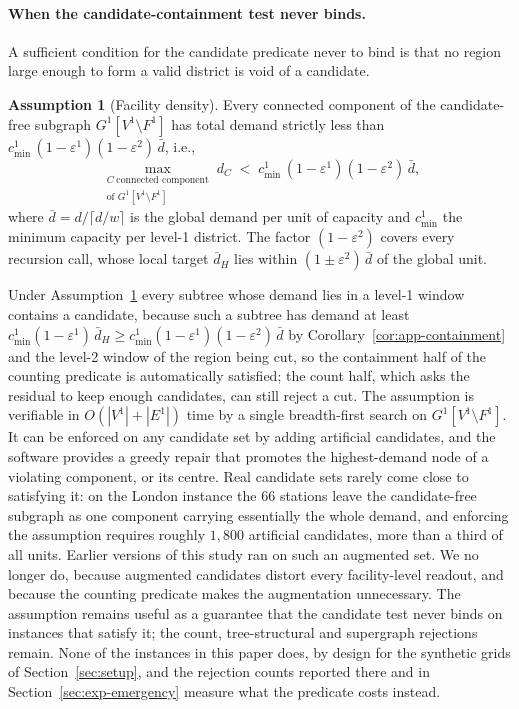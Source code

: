 \documentclass[preprint,12pt,authoryear]{elsarticle}
\theoremstyle{definition}
\newtheorem{assumption}[theorem]{Assumption}
\begin{document}
\paragraph{When the candidate-containment test never binds.}
A sufficient condition for the candidate predicate never to bind is that
no region large enough to form a valid district is void of a candidate.
%
\begin{assumption}[Facility density]
\label{asm:facility-density}
Every connected component of the candidate-free subgraph
$G^1[V^1 \setminus F^1]$ has total demand strictly less than
$c_{\min}^{1}\,(1-\varepsilon^1)(1-\varepsilon^2)\,\bar d$, i.e.,
\[
  \max_{\substack{C\;\text{connected component} \\ \text{of } G^1[V^1\setminus F^1]}}  d_C \;<\; c_{\min}^{1}\,(1-\varepsilon^1)(1-\varepsilon^2)\,\bar d,
\]
where $\bar d = d/\lceil d/w \rceil$ is the global demand per unit of capacity and $c^1_{\min}$ the minimum capacity per level-1 district. The factor $(1-\varepsilon^2)$ covers every recursion call, whose local target $\bar d_H$ lies within $(1\pm\varepsilon^2)\,\bar d$ of the global unit.
\end{assumption}
%
Under Assumption~\ref{asm:facility-density} every subtree whose demand
lies in a level-1 window contains a candidate, because such a subtree has demand at least $c^1_{\min}(1-\varepsilon^1)\,\bar d_H \geq c^1_{\min}(1-\varepsilon^1)(1-\varepsilon^2)\,\bar d$ by Corollary~\ref{cor:app-containment} and the level-2 window of the region being cut, so the containment half of the counting predicate is automatically satisfied; the count half, which asks the residual to keep enough candidates, can still reject a cut. The assumption is verifiable in $O(|V^1|+|E^1|)$ time by a single breadth-first search on $G^1[V^1 \setminus F^1]$. It can be enforced on any candidate set by adding artificial candidates, and the software provides a greedy repair that promotes the highest-demand node of a violating component, or its centre. Real candidate sets rarely come
close to satisfying it: on the London instance the $66$ stations leave the
candidate-free subgraph as one component carrying essentially the whole
demand, and enforcing the assumption requires roughly $1{,}800$ artificial
candidates, more than a third of all units. Earlier versions of this study ran on such an augmented set. We no longer do, because augmented candidates distort every facility-level readout, and because the counting predicate makes the augmentation unnecessary. The assumption remains useful as a guarantee that the candidate test never binds on instances that satisfy it; the count, tree-structural and supergraph rejections remain. None of the instances in this paper does, by design for the synthetic grids of Section~\ref{sec:setup}, and the rejection counts reported there and in Section~\ref{sec:exp-emergency} measure what the predicate costs instead.
\end{document}
